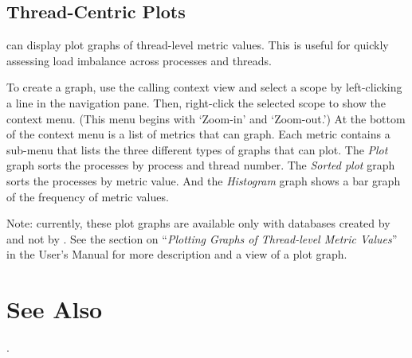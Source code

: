 \documentclass[english]{article}
\begin{document}
\subsection{Thread-Centric Plots}

 can display plot graphs of thread-level metric
values.  This is useful for quickly assessing load imbalance across
processes and threads.

To create a graph, use the calling context view and select a scope by
left-clicking a line in the navigation pane.
Then, right-click the selected scope to show the context menu.  (This
menu begins with `Zoom-in' and `Zoom-out.')
At the bottom of the context menu is a list of metrics that
 can graph.
Each metric contains a sub-menu that lists the three different types
of graphs that  can plot.
The \emph{Plot} graph sorts the processes by process and thread
number.
The \emph{Sorted plot} graph sorts the processes by metric value.
And the \emph{Histogram} graph shows a bar graph of the
frequency of metric values.

Note: currently, these plot graphs are available only with databases
created by  and not by .
See the section on ``\emph{Plotting Graphs of Thread-level Metric Values}''
in the User's Manual for more description and a view of a plot graph.





\section{See Also}

.
\end{document}
